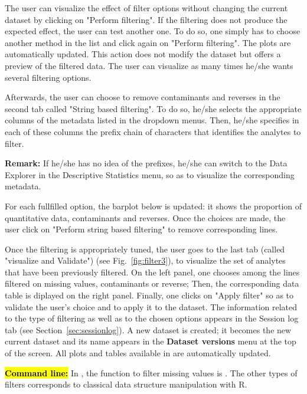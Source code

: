 \documentclass[12pt]{article}
\begin{document}
The user can visualize the effect of filter options without changing the 
current dataset by clicking on "Perform filtering". If the filtering does not 
produce the expected effect, the user can test another one. To do so, one 
simply has to choose another method in the list and click again on "Perform 
filtering". The plots are automatically updated. This action does not modify 
the dataset but offers a preview of the filtered data. The user can visualize 
as many times he/she wants several filtering options. 

Afterwards, the user can choose to remove contaminants and reverses in the 
second tab called "String based filtering". To do so, he/she selects the 
appropriate columns of the metadata listed in the dropdown menus. Then, 
he/she specifies in each of these columns the prefix chain of characters 
that identifies the analytes to filter.

\textbf{Remark:} If he/she has no idea of the prefixes, he/she can switch to 
the Data Explorer in the Descriptive Statistics menu, so as to visualize the 
corresponding metadata. 

For each fullfilled option, the barplot below is updated: it shows the 
proportion of quantitative data, contaminants and reverses. Once the choices 
are made, the user click on "Perform string based filtering" to remove 
corresponding lines.

{Once the filtering is appropriately tuned, the user goes to the last tab 
(called "visualize and Validate") (see Fig.~\ref{fig:filter3}), to visualize 
the set of analytes that have been previously filtered. On the left panel, 
one chooses among the lines filtered on missing values, contaminants or 
reverse; Then, the corresponding data table is diplayed on the right panel. 
Finally, one clicks on "Apply filter" so as to validate the user's choice and 
to apply it to the dataset. The information related to the type of filtering 
as well as to the chosen options appears in the Session log tab (see 
Section~\ref{sec:sessionlog}). A new dataset is created; it becomes the new 
current dataset and its name appears in the \textbf{Dataset versions} menu at 
the top of the screen. All plots and tables available in  
are automatically updated.}

\hl{\bf Command line:} In , the function to filter missing 
values is . The other types of filters corresponds to 
classical data structure manipulation with R.
\end{document}
